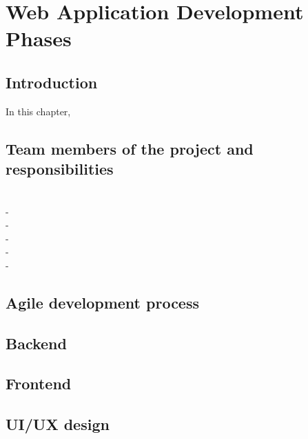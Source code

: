 \chapter{Web Application Development Phases}\label{ch:B}

\section{Introduction}
In this chapter, 

\section{Team members of the project and responsibilities}
\\- 
\\-
\\-
\\-
\\-
\section{Agile development process}

\section{Backend}

\section{Frontend}

\section{UI/UX design}